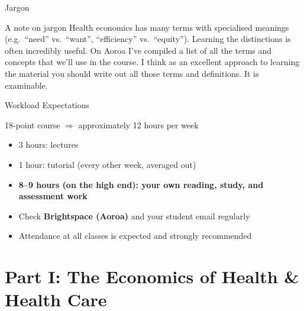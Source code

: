 \documentclass[aspectratio=169, 12pt]{beamer}
\begin{document}
\begin{frame}{Jargon}
	\begin{block}{A note on jargon}
		Health economics has many terms with specialised meanings (e.g.\ ``need'' vs.\ ``want'',
		``efficiency'' vs.\ ``equity''). Learning the distinctions is often incredibly useful. On Aoroa I've compiled a list of all the terms and concepts that we'll use in the course. I think as an excellent approach to learning the material you should write out all those terms and definitions. It is examinable. 
	\end{block}
\end{frame}

\begin{frame}{Workload Expectations}
  \begin{block}{18-point course $\Rightarrow$ approximately 12 hours per week}
    \begin{itemize}
      \item 3 hours: lectures
      \item 1 hour: tutorial (every other week, averaged out)
      \item \textbf{8--9 hours (on the high end): your own reading, study, and assessment work}
      \item Check \textbf{Brightspace (Aoroa)} and your student email regularly
      \item Attendance at all classes is expected and strongly recommended
    \end{itemize}
  \end{block}

\end{frame}



\section{Part I: The Economics of Health \& Health Care}
\end{document}
